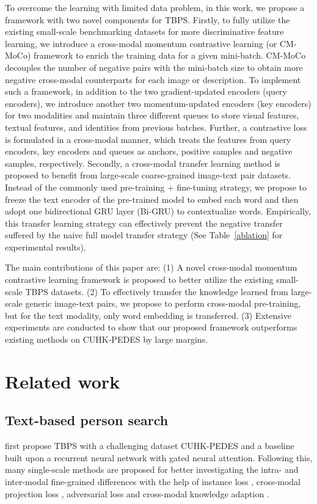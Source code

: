 \documentclass{bmvc2k}
\begin{document}
To overcome the learning with limited data problem, in this work, we propose a framework with two novel components for TBPS. 
Firstly, to fully utilize the existing small-scale benchmarking datasets for more discriminative feature learning, we introduce a cross-modal momentum contrastive learning (or CM-MoCo) framework to enrich the training data for a given mini-batch.
CM-MoCo decouples the number of negative pairs with the mini-batch size to obtain more negative cross-modal counterparts for each image or description. 
To implement such a framework, in addition to the two gradient-updated encoders (query encoders), we introduce another two momentum-updated encoders (key encoders) for two modalities and maintain three different queues to store visual features, textual features, and identities from previous batches. 
Further, a contrastive loss is formulated in a cross-modal manner, which treats the features from query encoders, key encoders and queues as anchors, positive samples and negative samples, respectively. 
Secondly, a cross-modal transfer learning method is proposed to benefit from large-scale coarse-grained image-text pair datasets.
Instead of the commonly used pre-training + fine-tuning strategy, we propose to freeze the text encoder of the pre-trained model to embed each word and then adopt one bidirectional GRU layer (Bi-GRU) \cite{cho2014gru} to contextualize words.
Empirically, this transfer learning strategy can effectively prevent the negative transfer suffered by the naive full model transfer strategy (See Table~\ref{ablation} for experimental results).   

The main contributions of this paper are: 
(1) A novel cross-modal momentum contrastive learning framework is proposed to better utilize the existing small-scale TBPS datasets. (2) To effectively transfer the knowledge learned from large-scale generic image-text pairs, we propose to perform cross-modal pre-training, but for the text modality, only word embedding is transferred. 
(3) Extensive experiments are conducted to show that our proposed framework outperforms existing methods on CUHK-PEDES \cite{li2017person} by large margins.
 \section{Related work}
\subsection{Text-based person search}
\citet{li2017person} first propose TBPS with a challenging dataset CUHK-PEDES and a baseline built upon a recurrent neural network with gated neural attention.
Following this, many single-scale methods are proposed for better investigating the intra- and inter-modal fine-grained differences with the help of instance loss \cite{zheng2020dual}, cross-modal projection loss \cite{zhang2018cmpc}, adversarial loss \cite{sarafianos2019adversarial} and cross-modal knowledge adaption \cite{chen2021cmka}.
\end{document}
